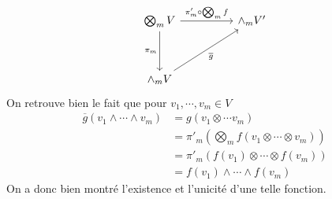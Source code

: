 \documentclass[../geometrie.tex]{subfiles}
\begin{document}
{{$$\begin{tikzcd}[ampersand replacement=\&]
					{\bigotimes_{m} V} \&\& \wedge_{m} V' \\
					\\
					\wedge_{m} V
					\arrow["\pi'_{m} \circ \bigotimes_{m} f", from=1-1, to=1-3]
					\arrow["\pi_{m}"', from=1-1, to=3-1]
					\arrow["{\overline{g}}"', from=3-1, to=1-3]
				\end{tikzcd}
			$$
			On retrouve bien le fait que pour $v_{1}, \cdots, v_{m} \in V$
			$$
				\begin{aligned}
					\overline{g}(v_{1} \wedge \cdots \wedge v_{m}) & = g(v_{1} \otimes \cdots v_{m}) \\
					& = \pi'_{m}(\bigotimes_{m} f(v_{1} \otimes \cdots \otimes v_{m})) \\
					& = \pi'_{m}(f(v_{1}) \otimes \cdots \otimes f(v_{m})) \\
					& = f(v_{1}) \wedge \cdots \wedge f(v_{m})
				\end{aligned}
			$$
			On a donc bien montré l'existence et l'unicité d'une telle fonction.
		}
	}
\end{document}
